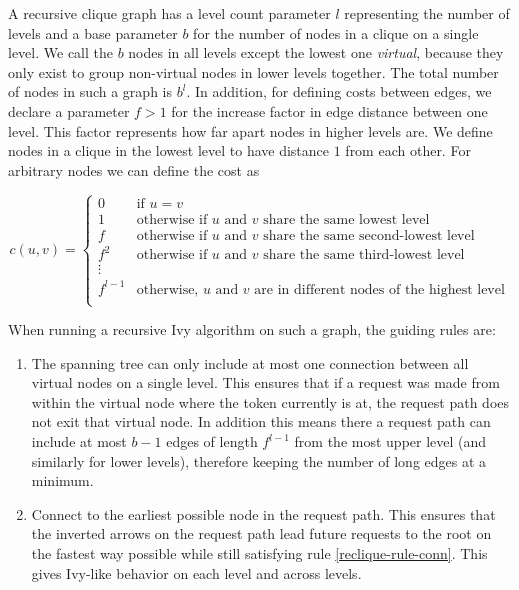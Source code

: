 \documentclass[a4paper, oneside]{discothesis}
\begin{document}
A recursive clique graph has a level count parameter $l$ representing the number of levels and a base parameter $b$ for the number of nodes in a clique on a single level. We call the $b$ nodes in all levels except the lowest one \textit{virtual}, because they only exist to group non-virtual nodes in lower levels together. The total number of nodes in such a graph is $b^l$. In addition, for defining costs between edges, we declare a parameter $f>1$ for the increase factor in edge distance between one level. This factor represents how far apart nodes in higher levels are. We define nodes in a clique in the lowest level to have distance $1$ from each other. For arbitrary nodes we can define the cost as

\begin{equation}
c(u,v)=\begin{cases}
0 & \text{if $u=v$} \\
1 & \text{otherwise if $u$ and $v$ share the same lowest level} \\
f & \text{otherwise if $u$ and $v$ share the same second-lowest level} \\
f^2 & \text{otherwise if $u$ and $v$ share the same third-lowest level} \\
\vdots & \\
f^{l-1} & \text{otherwise, $u$ and $v$ are in different nodes of the highest level} \\
\end{cases}
\end{equation}

When running a recursive Ivy algorithm on such a graph, the guiding rules are:
\begin{enumerate}
\item The spanning tree can only include at most one connection between all virtual nodes on a single level. This ensures that if a request was made from within the virtual node where the token currently is at, the request path does not exit that virtual node. In addition this means there a request path can include at most $b-1$ edges of length $f^{l-1}$ from the most upper level (and similarly for lower levels), therefore keeping the number of long edges at a minimum.
\label{reclique-rule-conn}
\item Connect to the earliest possible node in the request path. This ensures that the inverted arrows on the request path lead future requests to the root on the fastest way possible while still satisfying rule \ref{reclique-rule-conn}. This gives Ivy-like behavior on each level and across levels.
\label{reclique-rule-early}
\end{enumerate}
\end{document}
